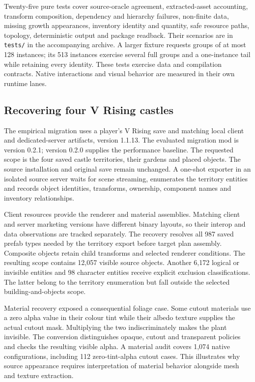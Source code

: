 \documentclass[11pt]{article}
\begin{document}
Twenty-five pure tests cover source-oracle agreement, extracted-asset accounting, transform composition,
dependency and hierarchy failures, non-finite data, missing growth appearances,
inventory identity and quantity, safe resource paths, topology, deterministic
output and package readback. Their scenarios are in \texttt{tests/} in the
accompanying archive. A larger fixture requests groups of at most 128 instances;
its 513 instances exercise several full groups and a one-instance tail while
retaining every identity. These tests exercise data and
compilation contracts. Native interactions and visual behavior are measured in
their own runtime lanes.

\subsection{Recovering four V Rising castles}

The empirical migration uses a player's V Rising save and matching local client
and dedicated-server artifacts, version 1.1.13. The evaluated migration mod is
version 0.2.1; version 0.2.0 supplies the performance baseline. The requested scope is the four
saved castle territories, their gardens and placed objects. The source
installation and original save remain unchanged. A one-shot exporter in an
isolated source server waits for scene streaming, enumerates the territory
entities and records object identities, transforms, ownership, component names
and inventory relationships.

Client resources provide the renderer and material assemblies. Matching client
and server marketing versions have different binary layouts, so their interop
and data observations are tracked separately. The recovery resolves all 987
saved prefab types needed by the territory export before target plan assembly.
Composite objects retain child transforms and selected renderer conditions.
The resulting scope contains 12,057 visible source objects. Another 6,172
logical or invisible entities and 98 character entities receive explicit
exclusion classifications. The latter belong to the territory enumeration but
fall outside the selected building-and-objects scope.

Material recovery exposed a consequential foliage case. Some cutout materials
use a zero alpha value in their colour tint while their albedo texture supplies
the actual cutout mask. Multiplying the two indiscriminately makes the plant
invisible. The conversion distinguishes opaque, cutout and transparent policies
and checks the resulting visible alpha. A material audit covers 1,074 native
configurations, including 112 zero-tint-alpha cutout cases. This illustrates why
source appearance requires interpretation of material behavior alongside mesh
and texture extraction.
\end{document}
